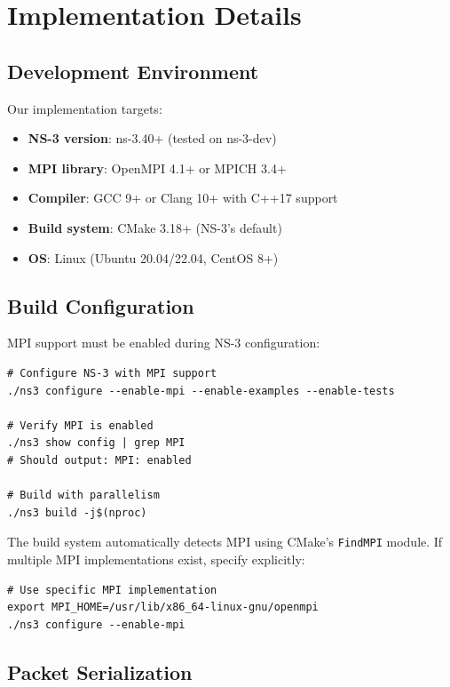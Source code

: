 \section{Implementation Details}
\label{sec:implementation}

\subsection{Development Environment}

Our implementation targets:
\begin{itemize}
    \item \textbf{NS-3 version}: ns-3.40+ (tested on ns-3-dev)
    \item \textbf{MPI library}: OpenMPI 4.1+ or MPICH 3.4+
    \item \textbf{Compiler}: GCC 9+ or Clang 10+ with C++17 support
    \item \textbf{Build system}: CMake 3.18+ (NS-3's default)
    \item \textbf{OS}: Linux (Ubuntu 20.04/22.04, CentOS 8+)
\end{itemize}

\subsection{Build Configuration}

MPI support must be enabled during NS-3 configuration:

\begin{lstlisting}[style=bash, caption={NS-3 MPI build configuration}]
# Configure NS-3 with MPI support
./ns3 configure --enable-mpi --enable-examples --enable-tests

# Verify MPI is enabled
./ns3 show config | grep MPI
# Should output: MPI: enabled

# Build with parallelism
./ns3 build -j$(nproc)
\end{lstlisting}

The build system automatically detects MPI using CMake's \texttt{FindMPI} module. If multiple MPI implementations exist, specify explicitly:

\begin{lstlisting}[style=bash]
# Use specific MPI implementation
export MPI_HOME=/usr/lib/x86_64-linux-gnu/openmpi
./ns3 configure --enable-mpi
\end{lstlisting}

\subsection{Packet Serialization}

